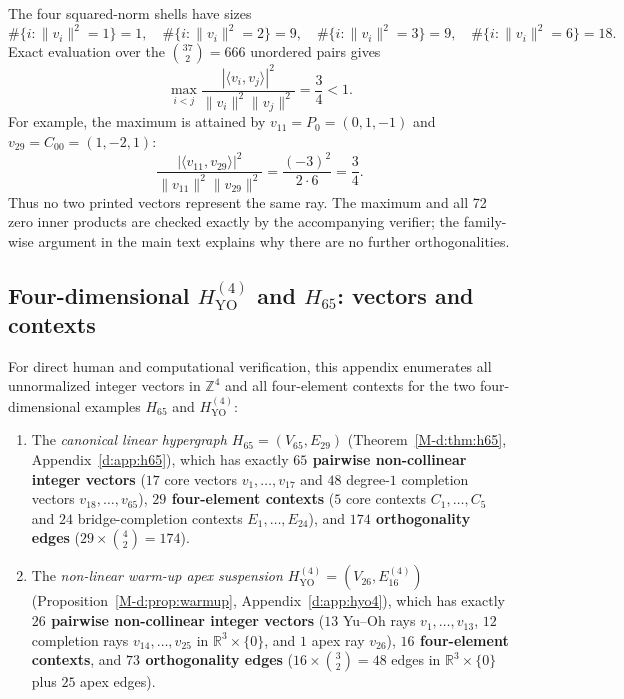 \documentclass[aps,pra,reprint,superscriptaddress,longbibliography,nofootinbib,floatfix,10pt]{revtex4-2}
\theoremstyle{definition}
\newcommand{\R}{\mathbb{R}}
\newcommand{\YO}{\mathrm{YO}}
\begin{document}
The four squared-norm shells have sizes
\begin{equation}
\#\{i:\|v_i\|^2=1\}=1,\quad
\#\{i:\|v_i\|^2=2\}=9,\quad
\#\{i:\|v_i\|^2=3\}=9,\quad
\#\{i:\|v_i\|^2=6\}=18.
\end{equation}
Exact evaluation over the $\binom{37}{2}=666$ unordered pairs gives
\begin{equation}\label{h:eq:app-max-overlap}
\max_{i<j}\frac{|\langle v_i,v_j\rangle|^2}{\|v_i\|^2\|v_j\|^2}=\frac34<1.
\end{equation}
For example, the maximum is attained by $v_{11}=P_0=(0,1,-1)$ and $v_{29}=C_{00}=(1,-2,1)$:
\begin{equation}
\frac{|\langle v_{11},v_{29}\rangle|^2}{\|v_{11}\|^2\|v_{29}\|^2}
=\frac{(-3)^2}{2\cdot6}=\frac34.
\end{equation}
Thus no two printed vectors represent the same ray. The maximum and all 72 zero inner products are checked exactly by the accompanying verifier; the family-wise argument in the main text explains why there are no further orthogonalities.

\subsection{\texorpdfstring{Four-dimensional $H_{\YO}^{(4)}$ and $H_{65}$: vectors and contexts}{Four-dimensional HYO(4) and H65: vectors and contexts}}

For direct human and computational verification, this appendix enumerates all unnormalized integer vectors in $\mathbb{Z}^4$ and all four-element contexts for the two four-dimensional examples $H_{65}$ and $H_{\YO}^{(4)}$:
\begin{enumerate}
\item The \emph{canonical linear hypergraph $H_{65}=(V_{65},E_{29})$} (Theorem~\ref{M-d:thm:h65}, Appendix~\ref{d:app:h65}), which has exactly \textbf{$65$ pairwise non-collinear integer vectors} ($17$ core vectors $v_1,\ldots,v_{17}$ and $48$ degree-$1$ completion vectors $v_{18},\ldots,v_{65}$), \textbf{$29$ four-element contexts} ($5$ core contexts $C_1,\ldots,C_5$ and $24$ bridge-completion contexts $E_1,\ldots,E_{24}$), and \textbf{$174$ orthogonality edges} ($29\times\binom{4}{2}=174$).
\item The \emph{non-linear warm-up apex suspension $H_{\YO}^{(4)}=(V_{26},E_{16}^{(4)})$} (Proposition~\ref{M-d:prop:warmup}, Appendix~\ref{d:app:hyo4}), which has exactly \textbf{$26$ pairwise non-collinear integer vectors} ($13$ Yu--Oh rays $v_1,\ldots,v_{13}$, $12$ completion rays $v_{14},\ldots,v_{25}$ in $\R^3\times\{0\}$, and $1$ apex ray $v_{26}$), \textbf{$16$ four-element contexts}, and \textbf{$73$ orthogonality edges} ($16\times\binom{3}{2}=48$ edges in $\R^3\times\{0\}$ plus $25$ apex edges).
\end{enumerate}
\end{document}
